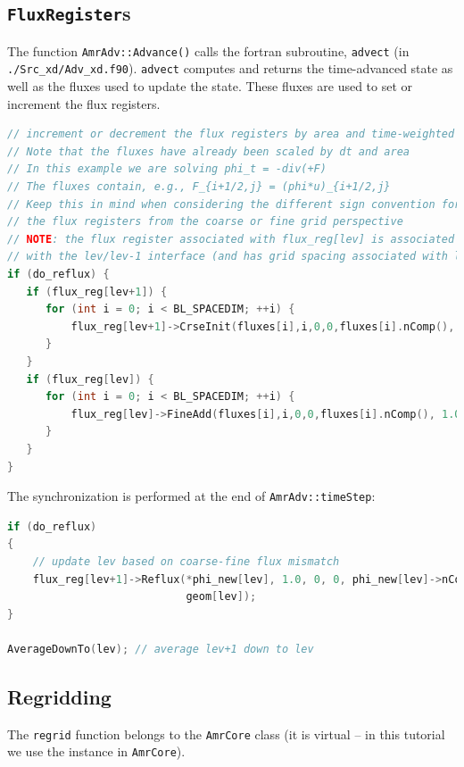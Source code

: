 \subsection{{\tt FluxRegister}s}
The function {\tt AmrAdv::Advance()} calls the fortran
subroutine, {\tt advect} (in {\tt ./Src\_xd/Adv\_xd.f90}).  {\tt advect} computes
and returns the time-advanced state as well as the fluxes used to update the state.
These fluxes are used to set or increment the flux registers.
\begin{lstlisting}[language=cpp]
// increment or decrement the flux registers by area and time-weighted fluxes
// Note that the fluxes have already been scaled by dt and area
// In this example we are solving phi_t = -div(+F)
// The fluxes contain, e.g., F_{i+1/2,j} = (phi*u)_{i+1/2,j}
// Keep this in mind when considering the different sign convention for updating
// the flux registers from the coarse or fine grid perspective
// NOTE: the flux register associated with flux_reg[lev] is associated
// with the lev/lev-1 interface (and has grid spacing associated with lev-1)
if (do_reflux) { 
   if (flux_reg[lev+1]) {
      for (int i = 0; i < BL_SPACEDIM; ++i) {
          flux_reg[lev+1]->CrseInit(fluxes[i],i,0,0,fluxes[i].nComp(), -1.0);
      }	    
   }
   if (flux_reg[lev]) {
      for (int i = 0; i < BL_SPACEDIM; ++i) {
          flux_reg[lev]->FineAdd(fluxes[i],i,0,0,fluxes[i].nComp(), 1.0);
      }
   }
}
\end{lstlisting}
The synchronization is performed at the end of {\tt AmrAdv::timeStep}:
\begin{lstlisting}[language=cpp]
if (do_reflux)
{
    // update lev based on coarse-fine flux mismatch
    flux_reg[lev+1]->Reflux(*phi_new[lev], 1.0, 0, 0, phi_new[lev]->nComp(),
                            geom[lev]);
}

AverageDownTo(lev); // average lev+1 down to lev
\end{lstlisting}

\subsection{Regridding}
The {\tt regrid} function belongs to the {\tt AmrCore} class (it is virtual -- in this
tutorial we use the instance in {\tt AmrCore}).

